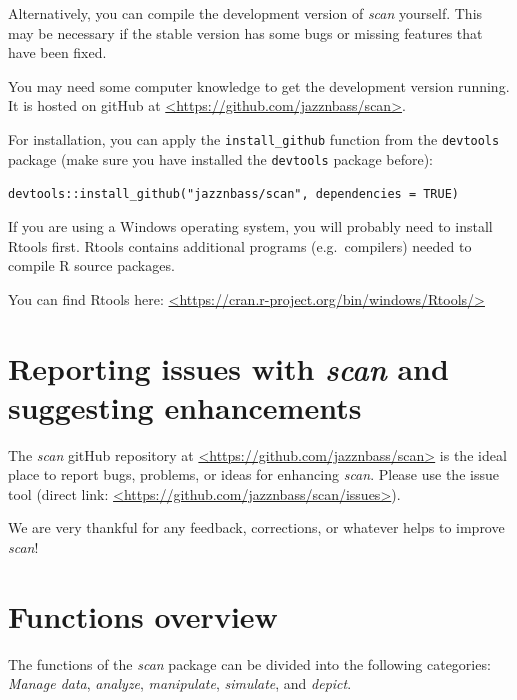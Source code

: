\documentclass[
  letterpaper,
  DIV=11,
  numbers=noendperiod]{scrreprt}
\begin{document}
Alternatively, you can compile the development version of \emph{scan}
yourself. This may be necessary if the stable version has some bugs or
missing features that have been fixed.

You may need some computer knowledge to get the development version
running. It is hosted on gitHub at
\href{https://github.com/jazznbass/scan}{\textless https://github.com/jazznbass/scan\textgreater{}}.

For installation, you can apply the \texttt{install\_github} function
from the \texttt{devtools} package (make sure you have installed the
\texttt{devtools} package before):

\texttt{devtools::install\_github("jazznbass/scan",\ dependencies\ =\ TRUE)}

If you are using a Windows operating system, you will probably need to
install Rtools first. Rtools contains additional programs
(e.g.~compilers) needed to compile R source packages.

You can find Rtools here:
\href{https://cran.r-project.org/bin/windows/Rtools/}{\textless https://cran.r-project.org/bin/windows/Rtools/\textgreater{}}

\hypertarget{reporting-issues-with-scan-and-suggesting-enhancements}{%
\section{\texorpdfstring{Reporting issues with \emph{scan} and
suggesting
enhancements}{Reporting issues with scan and suggesting enhancements}}\label{reporting-issues-with-scan-and-suggesting-enhancements}}

The \emph{scan} gitHub repository at
\href{https://github.com/jazznbass/scan}{\textless https://github.com/jazznbass/scan\textgreater{}}
is the ideal place to report bugs, problems, or ideas for enhancing
\emph{scan}. Please use the issue tool (direct link:
\href{https://github.com/jazznbass/scan/issues}{\textless https://github.com/jazznbass/scan/issues\textgreater{}}).

We are very thankful for any feedback, corrections, or whatever helps to
improve \emph{scan}!

\hypertarget{functions-overview}{%
\section{Functions overview}\label{functions-overview}}

The functions of the \emph{scan} package can be divided into the
following categories:\\
\emph{Manage data}, \emph{analyze}, \emph{manipulate}, \emph{simulate},
and \emph{depict}.
\end{document}
